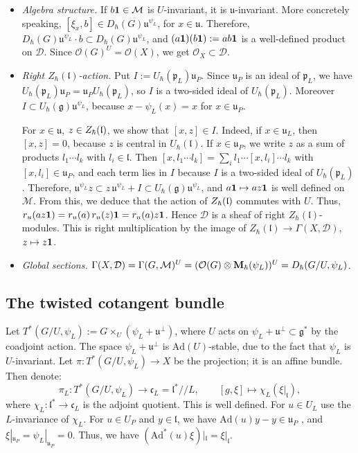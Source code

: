 \documentclass{article}
\theoremstyle{plain}
\theoremstyle{definition}
\theoremstyle{remark}
\numberwithin{equation}{section}
\begin{document}
\begin{itemize}
\item \emph{Algebra structure.} If $b\mathbf 1\in\mathcal M$ is $U$-invariant, it is $\mathfrak u$-invariant. More concretely speaking, 
$[\xi_x,b]\in D_\hbar(G)\mathfrak u^{\psi_L}$, for $x\in\mathfrak u$.
Therefore, $D_\hbar(G)\mathfrak u^{\psi_L}\cdot b\subset D_\hbar(G)\mathfrak u^{\psi_L}$, and $(a\mathbf 1)(b\mathbf 1):=ab\mathbf 1$ is a well-defined
product on $\mathcal D$. Since $\mathcal O(G)^U=\mathcal O(X)$, we get $\mathcal O_X\subset\mathcal D$.
\item \emph{Right $Z_\hbar(\mathfrak l)$-action.} Put $I:=U_\hbar(\mathfrak p_L)\mathfrak u_P$. Since $\mathfrak u_P$ is an ideal of $\mathfrak p_L$, we have $U_\hbar(\mathfrak p_L)\mathfrak u_P=\mathfrak u_PU_\hbar(\mathfrak p_L)$, so $I$ is a two-sided ideal of $U_\hbar(\mathfrak p_L)$. Moreover $I\subset U_\hbar(\mathfrak g)\mathfrak u^{\psi_L}$, because $x-\psi_L(x)=x$ for $x\in\mathfrak u_P$.

For $x\in\mathfrak u$, $z\in Z_\hbar(\mathfrak{l})$, we show that $[x,z]\in I$. Indeed, if $x\in\mathfrak u_L$, then $[x,z]=0$, because $z$ is central in $U_\hbar(\mathfrak l)$.
If $x\in\mathfrak u_P$, we write $z$ as a sum of products $l_1\cdots l_k$ with $l_i\in\mathfrak l$. Then $[x, l_1\cdots l_k]=\sum_il_1\cdots[x,l_i]\cdots l_k$ with $[x,l_i]\in\mathfrak u_P$, and each term lies in $I$ because $I$ is a two-sided ideal of $U_\hbar(\mathfrak p_L)$.
Therefore, $\mathfrak u^{\psi_L}z\subset z\,\mathfrak u^{\psi_L}+I\subset U_\hbar(\mathfrak g)\mathfrak u^{\psi_L}$, and $a\mathbf 1\mapsto az\mathbf 1$ is well defined on $\mathcal M$. From this, we deduce that the action of $Z_\hbar(\mathfrak{l})$ commutes with $U$. Thus, $r_u(az\mathbf 1)=r_u(a)\,r_u(z)\mathbf 1=r_u(a)z\mathbf 1$. Hence $\mathcal D$ is a sheaf of right $Z_\hbar(\mathfrak l)$-modules. This
is right multiplication by the image of $Z_\hbar(\mathfrak l)\to\Gamma(X,\mathcal D)$, $z\mapsto z\mathbf 1$.
\item \emph{Global sections.} $\Gamma(X,\mathcal D)=\Gamma(G,\mathcal M)^U=(\mathcal O(G)\otimes\mathbf{M}_\hbar(\psi_L))^U
=D_\hbar(G/U,\psi_L)$.
\end{itemize}

\subsection{The twisted cotangent bundle}
Let $T^*(G/U,\psi_L):=G\times_U(\psi_L+\mathfrak u^\perp)$, where $U$ acts on $\psi_L+\mathfrak u^\perp\subset\mathfrak g^*$ by
the coadjoint action. The space $\psi_L+\mathfrak u^\perp$ is $\mathrm{Ad}(U)$-stable, due to the fact that $\psi_L$ is $U$-invariant.
Let $\pi\colon T^*(G/U,\psi_L)\to X$ be the projection; it is an affine bundle. Then denote:
\[
\pi_L\colon T^*(G/U,\psi_L)\to\mathfrak c_L=\mathfrak l^*/\!/L,\qquad [g,\xi]\mapsto\chi_L(\xi|_{\mathfrak l}),
\]
where $\chi_L\colon\mathfrak l^*\to\mathfrak c_L$ is the adjoint quotient. This is well defined. For $u\in U_L$ use the
$L$-invariance of $\chi_L$. For $u\in U_P$ and $y\in\mathfrak l$, we have $\mathrm{Ad}(u)y-y\in\mathfrak u_P$ , and
$\xi|_{\mathfrak u_P}=\psi_L|_{\mathfrak u_P}=0$. Thus, we have $(\mathrm{Ad}^*(u)\xi)|_{\mathfrak l}=\xi|_{\mathfrak l}$.
\end{document}
